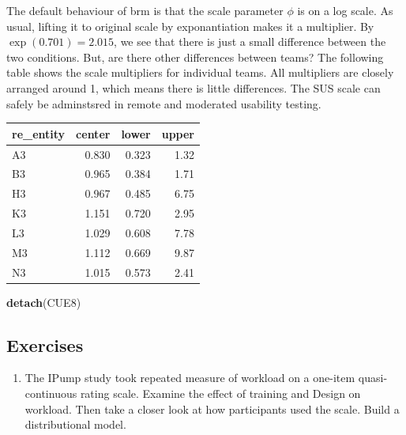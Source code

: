 \documentclass[]{svmono}
\newenvironment{Shaded}{\begin{snugshade}}{\end{snugshade}}
\newcommand{\KeywordTok}[1]{\textcolor[rgb]{0.13,0.29,0.53}{\textbf{#1}}}
\newcommand{\StringTok}[1]{\textcolor[rgb]{0.31,0.60,0.02}{#1}}
\newcommand{\OperatorTok}[1]{\textcolor[rgb]{0.81,0.36,0.00}{\textbf{#1}}}
\newcommand{\NormalTok}[1]{#1}
\providecommand{\tightlist}{%
  \setlength{\itemsep}{0pt}\setlength{\parskip}{0pt}}
\begin{document}
The default behaviour of brm is that the scale parameter \(\phi\) is on
a log scale. As usual, lifting it to original scale by exponantiation
makes it a multiplier. By \(\exp(0.701) = 2.015\), we see that there is
just a small difference between the two conditions. But, are there other
differences between teams? The following table shows the scale
multipliers for individual teams. All multipliers are closely arranged
around 1, which means there is little differences. The SUS scale can
safely be adminstsred in remote and moderated usability testing.

\begin{Shaded}
\end{Shaded}

\begin{longtable}[]{@{}lrrr@{}}
\toprule
re\_entity & center & lower & upper\tabularnewline
\midrule
\endhead
A3 & 0.830 & 0.323 & 1.32\tabularnewline
B3 & 0.965 & 0.384 & 1.71\tabularnewline
H3 & 0.967 & 0.485 & 6.75\tabularnewline
K3 & 1.151 & 0.720 & 2.95\tabularnewline
L3 & 1.029 & 0.608 & 7.78\tabularnewline
M3 & 1.112 & 0.669 & 9.87\tabularnewline
N3 & 1.015 & 0.573 & 2.41\tabularnewline
\bottomrule
\end{longtable}

\begin{Shaded}
\begin{Highlighting}[]
\KeywordTok{detach}\NormalTok{(CUE8)}
\end{Highlighting}
\end{Shaded}

\subsection{Exercises}\label{exercises-10}

\begin{enumerate}
\def\labelenumi{\arabic{enumi}.}
\tightlist
\item
  The IPump study took repeated measure of workload on a one-item
  quasi-continuous rating scale. Examine the effect of training and
  Design on workload. Then take a closer look at how participants used
  the scale. Build a distributional model.
\end{enumerate}
\end{document}
